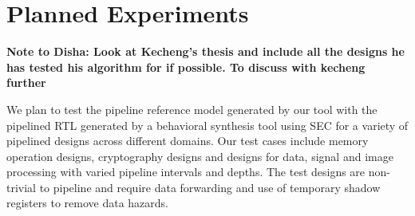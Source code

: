 \chapter{Planned Experiments}
\label{sec:SEC}

{\bf Note to Disha: Look at Kecheng's thesis and include all the designs he has tested his algorithm for if possible. To discuss with kecheng further}  

We plan to test the pipeline reference model generated by our tool with the pipelined RTL generated by a behavioral synthesis tool using SEC for a variety of pipelined designs across different domains. Our test cases include memory operation designs, cryptography designs and designs for data, signal and image processing with varied pipeline intervals and depths. The test designs are non-trivial to pipeline and require data forwarding and use of temporary shadow registers to remove data hazards.

